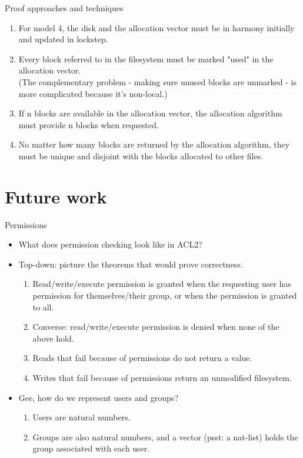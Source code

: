 \documentclass{beamer}
\begin{document}
\begin{frame}{Proof approaches and techniques}
  \begin{enumerate}
  \item For model 4, the disk and the allocation vector must be in harmony
    initially and updated in lockstep.
  \item Every block referred to in the filesystem must be marked
    "used" in the allocation vector.\\
    (The complementary problem - making sure unused
      blocks are unmarked - is more complicated because it's non-local.)
  \item If n blocks are available in the allocation vector, the
    allocation algorithm must provide n blocks when requested.
  \item No matter how many blocks are returned by the allocation
    algorithm, they must be unique and disjoint with the blocks
    allocated to other files.
  \end{enumerate}
\end{frame}

\section{Future work}

\begin{frame}{Permissions}
  \begin{itemize}
  \item What does permission checking look like in ACL2?
  \item Top-down: picture the theorems that would prove correctness.
    \begin{enumerate}
    \item Read/write/execute permission is granted when the requesting
      user has permission for themselves/their group, or when the
      permission is granted to all.
    \item Converse: read/write/execute permission is denied when none
      of the above hold.
    \item Reads that fail because of permissions do not return a value.
    \item Writes that fail because of permissions return an unmodified
      filesystem.
    \end{enumerate}
  \item Gee, how do we represent users and groups?
    \begin{enumerate}
    \item Users are natural numbers.
    \item Groups are also natural numbers, and a vector (psst: a
      nat-list) holds the group associated with each user.
    \end{enumerate}
  \end{itemize}
\end{frame}
\end{document}
